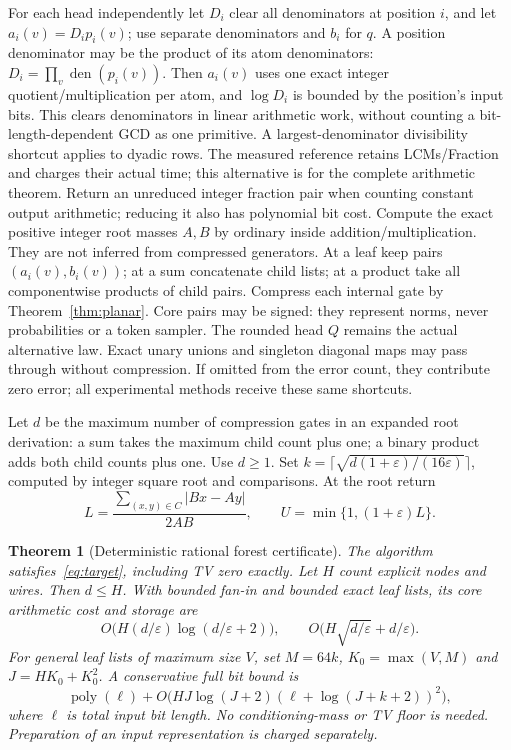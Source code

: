 \documentclass[11pt]{article}
\newtheorem{theorem}{Theorem}
\begin{document}
For each head independently let $D_i$ clear all denominators at position $i$,
and let $a_i(v)=D_i p_i(v)$; use separate denominators and $b_i$ for $q$.
A position denominator may be the product of its atom denominators:
$D_i=\prod_v\operatorname{den}(p_i(v))$. Then $a_i(v)$ uses one exact integer
quotient/multiplication per atom, and $\log D_i$ is bounded by the position's
input bits. This clears denominators in linear arithmetic work, without
counting a bit-length-dependent GCD as one primitive. A largest-denominator
divisibility shortcut applies to dyadic rows. The measured reference retains
LCMs/Fraction and charges their actual time; this alternative is for the
complete arithmetic theorem. Return an unreduced integer fraction pair when
counting constant output arithmetic; reducing it also has polynomial bit cost.
Compute the exact positive integer root masses $A,B$ by ordinary inside
addition/multiplication. They are not inferred from compressed generators.
At a leaf keep pairs $(a_i(v),b_i(v))$; at a sum concatenate child lists;
at a product take all componentwise products of child pairs. Compress each
internal gate by Theorem~\ref{thm:planar}.
Core pairs may be signed: they represent norms, never probabilities or a
token sampler. The rounded head $Q$ remains the actual alternative law.
Exact unary unions and singleton diagonal maps may pass through without
compression. If omitted from the error count, they contribute zero error;
all experimental methods receive these same shortcuts.

Let $d$ be the maximum number of compression gates in an expanded root
derivation: a sum takes the maximum child count plus one; a binary product
adds both child counts plus one. Use $d\geq1$. Set
$k=\lceil\sqrt{d(1+\varepsilon)/(16\varepsilon)}\rceil$, computed by integer square root and
comparisons. At the root return
\begin{equation}\label{eq:certificate}
 L=\frac{\sum_{(x,y)\in C}|Bx-Ay|}{2AB},
 \qquad U=\min\{1,(1+\varepsilon)L\}.
\end{equation}

\begin{theorem}[Deterministic rational forest certificate]\label{thm:forest}
The algorithm satisfies~\eqref{eq:target}, including TV zero exactly.
Let $H$ count explicit nodes and wires. Then $d\leq H$. With bounded fan-in
and bounded exact leaf lists, its core arithmetic cost and storage are
\[
 O\bigl(H(d/\varepsilon)\log(d/\varepsilon+2)\bigr),\qquad
 O\bigl(H\sqrt{d/\varepsilon}+d/\varepsilon\bigr).
\]
For general leaf lists of maximum size $V$, set
$M=64k$, $K_0=\max(V,M)$ and $J=HK_0+K_0^2$.
A conservative full bit bound is
\[
 \operatorname{poly}(\ell)+
 O\bigl(HJ\log(J+2)(\ell+\log(J+k+2))^2\bigr),
\]
where $\ell$ is total input bit length. No conditioning-mass or TV floor is
needed. Preparation of an input representation is charged separately.
\end{theorem}
\end{document}
